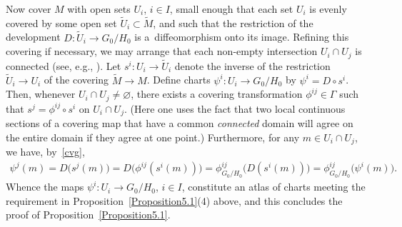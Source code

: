 \documentclass[11pt]{article}
\numberwithin{equation}{section}
\begin{document}
Now cover $M$ with open sets $U_i$, $i \in I$, small enough that each
set $U_i$ is evenly covered by some open set $\tilde U_i \subset
\tilde M$, and such that the restriction of the development $D
\colon \tilde U_i \rightarrow {G_0/H_0}$ is a~dif\/feomorphism onto its
image. Ref\/ining this covering if necessary, we may arrange that each
non-empty intersection $U_i \cap U_j $ is connected (see, e.g., \cite[Theorem~I.5.1]{Bott_Tu_82}). Let $s^i \colon U_i \rightarrow \tilde
U_i$ denote the inverse of the restriction $\tilde U_i \rightarrow
U_i$ of the covering $\tilde M \rightarrow M$. Def\/ine charts $\psi^i
\colon U_i \rightarrow {G_0/H_0}$ by $\psi^i=D \circ s^i$. Then, whenever
$U_i \cap U_j\ne \varnothing $, there exists a covering transformation
$\phi^{ij}\in \Gamma $ such that $s^j=\phi^{ij} \circ s^i$ on $U_i\cap
U_j$. (Here one uses the fact that two local continuous sections of a
covering map that have a common {\em connected} domain will agree on
the entire domain if they agree at one point.) Furthermore, for any $
m \in U_i\cap U_j$, we have, by~\eqref{cvg},
\begin{gather*}
  \psi^j(m)=D\big(s^j(m)\big)=D\big(\phi^{ij}(s^i(m))\big)
  =\phi^{ij}_{G_0/H_0}\big(D(s^i(m))\big)=\phi^{ij}_{G_0/H_0}\big(\psi^i(m)\big).
\end{gather*}
Whence the maps $\psi^i \colon U_i \rightarrow {G_0/H_0}$, $i \in I$,
constitute an atlas of charts meeting the requirement in Proposition~\ref{Proposition5.1}(4) %
above, and this concludes the proof of
Proposition~\ref{Proposition5.1}.
\end{document}
